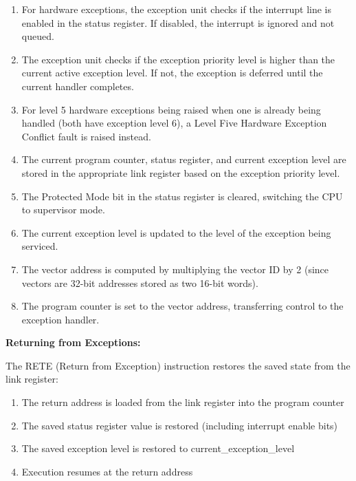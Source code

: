 \begin{enumerate}
	\item For hardware exceptions, the exception unit checks if the interrupt line is enabled in the status register. If
	      disabled, the interrupt is ignored and not queued.

	\item The exception unit checks if the exception priority level is higher than the current active exception level. If not,
	      the exception is deferred until the current handler completes.

	\item For level 5 hardware exceptions being raised when one is already being handled (both have exception level 6), a Level
	      Five Hardware Exception Conflict fault is raised instead.

	\item The current program counter, status register, and current exception level are stored in the appropriate link register
	      based on the exception priority level.

	\item The Protected Mode bit in the status register is cleared, switching the CPU to supervisor mode.

	\item The current exception level is updated to the level of the exception being serviced.

	\item The vector address is computed by multiplying the vector ID by 2 (since vectors are 32-bit addresses stored as two
	      16-bit words).

	\item The program counter is set to the vector address, transferring control to the exception handler.
\end{enumerate}

\textbf{Returning from Exceptions:}

The RETE (Return from Exception) instruction restores the saved state from the link register:

\begin{enumerate}
	\item The return address is loaded from the link register into the program counter
	\item The saved status register value is restored (including interrupt enable bits)
	\item The saved exception level is restored to current\_exception\_level
	\item Execution resumes at the return address
\end{enumerate}

